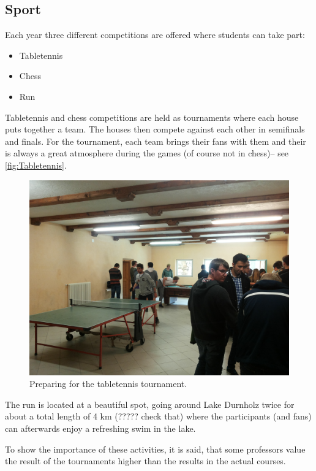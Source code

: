 \subsection{Sport}
Each year three different competitions are offered where students can take part:
\begin{itemize}
\item Tabletennis
\item Chess
\item Run
\end{itemize}
Tabletennis and chess competitions are held as tournaments where each house puts together a team. The houses then compete against each other in semifinals and finals. For the tournament, each team brings their fans with them and their is always a great atmosphere during the games (of course not in chess)-- see \autoref{fig:Tabletennis}. 
\begin{figure}[ht]%
 	\begin{center}%
 		\includegraphics[scale=0.06]{img/Tabletennis.jpg}%
 		\caption{Preparing for the tabletennis tournament.}\label{fig:Tabletennis}%
 	\end{center}%
\end{figure}

The run is located at a beautiful spot, going around Lake Durnholz twice for about a total length of 4 km (????? check that) where the participants (and fans) can afterwards enjoy a refreshing swim in the lake. 

To show the importance of these activities, it is said, that some professors value the result of the tournaments higher than the results in the actual courses.

